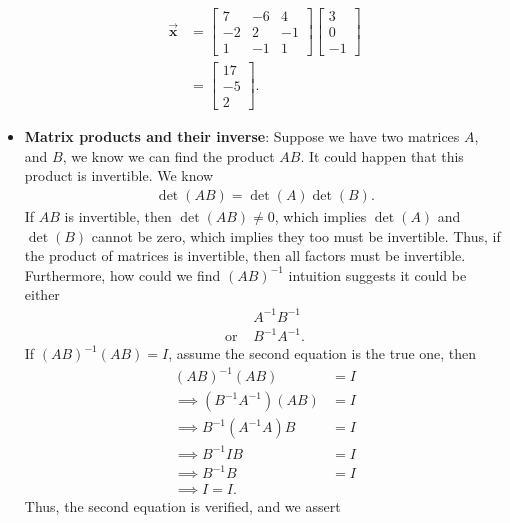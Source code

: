 \documentclass{report}
\begin{document}
\begin{itemize}
        \begin{align*}
            \vec{\mathbf{x}} &= \begin{bmatrix} 7 & -6 & 4 \\ -2 & 2 & -1 \\ 1 & -1 & 1 \end{bmatrix} \begin{bmatrix} 3 \\ 0 \\ -1 \end{bmatrix} \\
                             &= \begin{bmatrix} 17 \\ -5 \\ 2\end{bmatrix}
        .\end{align*}
    \item \textbf{Matrix products and their inverse}: Suppose we have two matrices $A$, and $B$, we know we can find the product $AB$. It could happen that this product is invertible. We know
        \begin{align*}
            \det(AB) = \det(A)\det(B)
        .\end{align*}
        If $AB$ is invertible, then $\det(AB) \ne 0$, which implies $\det(A)$ and $\det(B)$ cannot be zero, which implies they too must be invertible. Thus, if the product of matrices is invertible, then all factors must be invertible.
        \bigbreak \noindent 
        Furthermore, how could we find $(AB)^{-1}$ intuition suggests it could be either
        \begin{align*}
            &A^{-1}B^{-1} \\
            \text{or } &B^{-1}A^{-1}
        .\end{align*}
        \bigbreak \noindent 
        If $(AB)^{-1}(AB) = I$, assume the second equation is the true one, then
        \begin{align*}
            (AB)^{-1}(AB) &=I \\
            \implies (B^{-1}A^{-1})(AB) &= I  \\
            \implies B^{-1}(A^{-1}A)B&=I \\
            \implies B^{-1}IB &=I\\
            \implies B^{-1}B &= I\\
            \implies I=I
        .\end{align*}
        \bigbreak \noindent 
        Thus, the second equation is verified, and we assert
        \begin{align*}

\end{align*}
\end{itemize}
\end{document}

